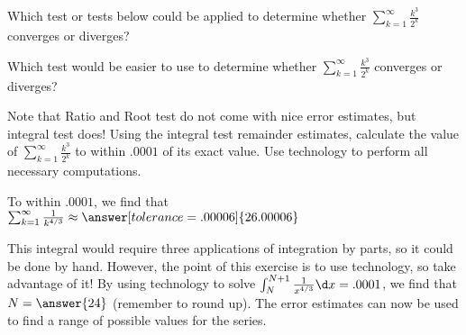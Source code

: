 \documentclass{ximera}
\author{Jim Talamo}
\begin{document}
\begin{exercise}

Which test or tests below could be applied to determine whether $\sum_{k=1}^{\infty} \frac{k^3}{2^k}$ converges or diverges?

\begin{multipleChoice}
\end{multipleChoice}

Which test would be easier to use to determine whether $\sum_{k=1}^{\infty} \frac{k^3}{2^k}$ converges or diverges?

\begin{multipleChoice}
\end{multipleChoice}

\begin{exercise}
Note that Ratio and Root test do not come with nice error estimates, but integral test does!  Using the integral test remainder estimates, calculate the value of $\sum_{k=1}^{\infty} \frac{k^3}{2^k}$ to within $.0001$ of its exact value.  Use technology to perform all necessary computations.


To within $.0001$, we find that $\sum_{k=1}^{\infty}  \frac{1}{k^{4/3}} \approx \answer[tolerance=.00006]{26.00006}$
\begin{hint}
This integral would require three applications of integration by parts, so it could be done by hand.  However, the point of this exercise is to use technology, so take advantage of it!  By using technology to solve $\int_N^{N+1} \frac{1}{x^{4/3}} \d x =.0001$, we find that $N = \answer{24}$ (remember to round up).  The error estimates can now be used to find a range of possible values for the series.
\end{hint}

\end{exercise}
\end{exercise}
\end{document}
